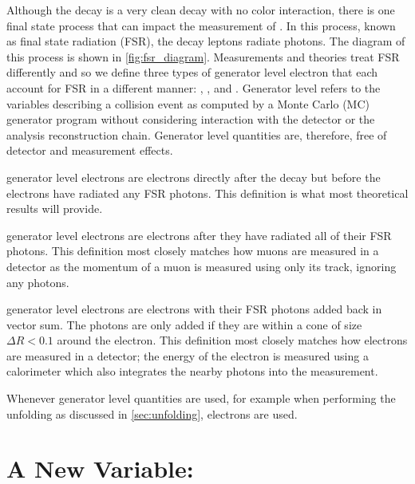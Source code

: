 Although the \Ztoee decay is a very clean decay with no color interaction,
there is one final state process that can impact the measurement of \Z
\bosonpt. In this process, known as final state radiation (FSR),  the decay
leptons radiate photons.  The diagram of this process is shown in
\cref{fig:fsr_diagram}. Measurements and theories treat FSR differently and so
we define three types of generator level electron that each account for FSR in
a different manner: \born, \bare, and \dressed. Generator level refers to the
variables describing a collision event as computed by a Monte Carlo (MC)
generator program without considering interaction with the detector or the
analysis reconstruction chain. Generator level quantities are, therefore, free
of detector and measurement effects.

\Born generator level electrons are electrons directly after the \Ztoee decay
but before the electrons have radiated any FSR photons. This definition is what
most theoretical results will provide.

\Bare generator level electrons are \born electrons after they have radiated
all of their FSR photons. This definition most closely matches how muons are
measured in a detector as the momentum of a muon is measured using only its
track, ignoring any photons.

\Dressed generator level electrons are \bare electrons with their FSR photons
added back in vector sum. The photons are only added if they are within a cone
of size $\Delta R < 0.1$ around the electron. This definition most closely
matches how electrons are measured in a detector; the energy of the electron is
measured using a calorimeter which also integrates the nearby photons into the
measurement.

Whenever generator level quantities are used, for example when performing the
unfolding as discussed in \cref{sec:unfolding}, \dressed electrons are used.


\section{A New Variable: \texorpdfstring{\phistar}{Phistar}}

